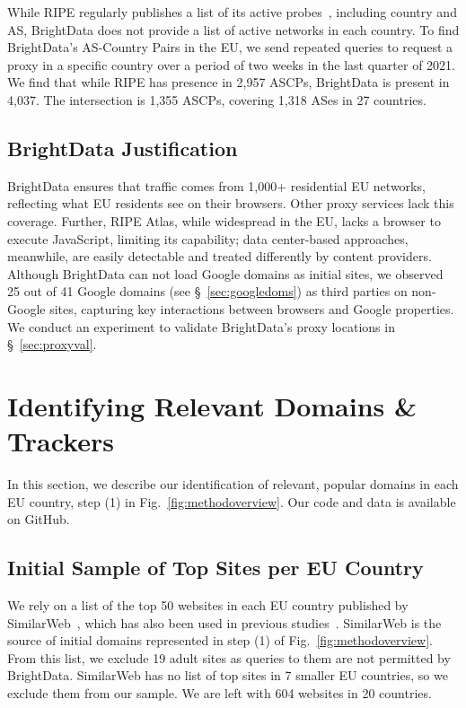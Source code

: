 While RIPE regularly publishes a list of its active probes~\cite{RipeAtlasInfo},
including country and AS,
BrightData does not provide a list of active networks in each country. 
To find BrightData's AS-Country Pairs in the EU, we send repeated queries to request 
a proxy in a specific country over a period of two weeks in the last quarter of 2021. 
We find that while RIPE has presence in 2,957 ASCPs,
BrightData is present in 4,037. The intersection is 1,355 ASCPs, covering 1,318 ASes in 27 countries.

\subsection{BrightData Justification}
BrightData ensures that traffic comes from 1,000+ residential EU networks, reflecting what EU residents see on their browsers. 
Other proxy services lack this coverage. 
Further, RIPE Atlas, while widespread in the EU, lacks a browser to execute JavaScript, 
limiting its capability; data center-based approaches, meanwhile, are easily detectable and treated differently by content providers. 
Although BrightData can not load Google domains as initial sites, 
we observed 25 out of 41 Google domains (see \S~\ref{sec:googledoms}) as third parties on non-Google sites, 
capturing key interactions between browsers and Google properties.
We conduct an experiment to validate BrightData's proxy locations in \S~\ref{sec:proxyval}.

\section{Identifying Relevant Domains \& Trackers}
\label{sec:domains}
In this section, we describe our identification of relevant, popular
domains in each EU country, step (1) in Fig.~\ref{fig:methodoverview}. 
Our code and data is available on GitHub.~\cite{githubrepo}

\subsection{Initial Sample of Top Sites per EU Country}
We rely on a list of the top 50 websites in each EU country published by SimilarWeb~\cite{SimilarWeb}, 
which has also been used in previous studies~\cite{bui2022opt,zheutlin2021data}. 
SimilarWeb is the source of initial domains represented in step (1) of Fig.~\ref{fig:methodoverview}.
From this list, we exclude 19 adult sites as queries to them are not permitted by BrightData. 
 SimilarWeb has no list of top sites in 7 smaller EU countries,
so we exclude them from our sample.
We are left with 604 websites in 20 countries. 

